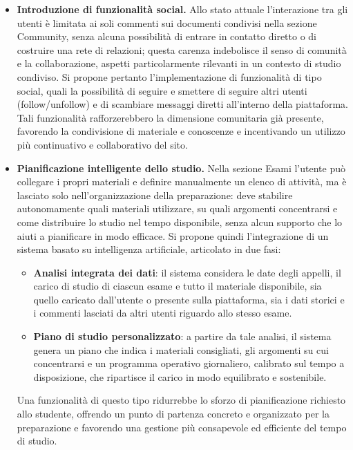 \begin{itemize}
  \item \textbf{Introduzione di funzionalità social.} Allo stato attuale
  l'interazione tra gli utenti è limitata ai soli commenti sui documenti
  condivisi nella sezione Community, senza alcuna possibilità di entrare in
  contatto diretto o di costruire una rete di relazioni; questa carenza
  indebolisce il senso di comunità e la collaborazione, aspetti particolarmente
  rilevanti in un contesto di studio condiviso. Si propone pertanto
  l'implementazione di funzionalità di tipo social, quali la possibilità di
  seguire e smettere di seguire altri utenti (follow/unfollow) e di scambiare
  messaggi diretti all'interno della piattaforma. Tali funzionalità
  rafforzerebbero la dimensione comunitaria già presente, favorendo la
  condivisione di materiale e conoscenze e incentivando un utilizzo più
  continuativo e collaborativo del sito.

  \item \textbf{Pianificazione intelligente dello studio.} Nella sezione Esami
  l'utente può collegare i propri materiali e definire manualmente un elenco di
  attività, ma è lasciato solo nell'organizzazione della preparazione: deve
  stabilire autonomamente quali materiali utilizzare, su quali argomenti
  concentrarsi e come distribuire lo studio nel tempo disponibile, senza alcun
  supporto che lo aiuti a pianificare in modo efficace. Si propone quindi
  l'integrazione di un sistema basato su intelligenza artificiale, articolato in
  due fasi:
  \begin{itemize}
    \item \textbf{Analisi integrata dei dati}: il sistema considera le date
    degli appelli, il carico di studio di ciascun esame e tutto il materiale
    disponibile, sia quello caricato dall'utente o presente sulla piattaforma,
    sia i dati storici e i commenti lasciati da altri utenti riguardo allo
    stesso esame.
    \item \textbf{Piano di studio personalizzato}: a partire da tale analisi, il
    sistema genera un piano che indica i materiali consigliati, gli argomenti su
    cui concentrarsi e un programma operativo giornaliero, calibrato sul tempo a
    disposizione, che ripartisce il carico in modo equilibrato e sostenibile.
  \end{itemize}
  Una funzionalità di questo tipo ridurrebbe lo sforzo di pianificazione
  richiesto allo studente, offrendo un punto di partenza concreto e organizzato
  per la preparazione e favorendo una gestione più consapevole ed efficiente del
  tempo di studio.


\end{itemize}
